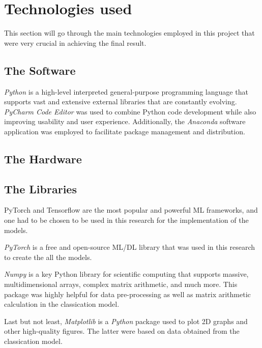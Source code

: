 \section{Technologies used}

This section will go through the main technologies employed in this project that were very crucial in achieving the final result.

\subsection{The Software}

\textit{Python} is a high-level interpreted general-purpose programming language that supports vast and extensive external libraries that are constantly evolving. \textit{PyCharm Code Editor} was used to combine Python code development while also improving usability and user experience. Additionally, the \textit{Anaconda} software application was employed to facilitate package management and distribution.

\subsection{The Hardware}

\subsection{The Libraries}

PyTorch and Tensorflow are the most popular and powerful \gls{ML} frameworks, and one had to be chosen to be used in this research for the implementation of the models. 


\textit{PyTorch} is a free and open-source \gls{ML}/\gls{DL} library that was used in this research to create the all the models. 

\textit{Numpy} is a key Python library for scientific computing that supports massive, multidimensional arrays, complex matrix arithmetic, and much more. This package was highly helpful for data pre-processing as well as matrix arithmetic calculation in the classication model.

Last but not least, \textit{Matplotlib} is a \textit{Python} package used to plot 2D graphs and other high-quality figures. The latter were based on data obtained from the classication model.